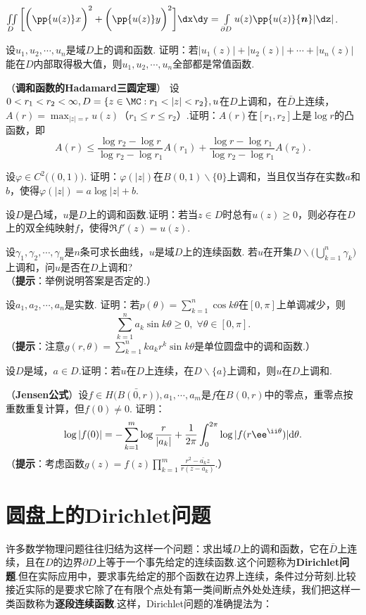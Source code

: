 \begin{xiti}
\begin{enuma}
  \item $\iint\limits_D\bigg[\bigg(\pp{u(z)}x\bigg)^2+\bigg(\pp{u(z)}y\bigg)^2\bigg]
  \dx\dy=\int\limits_{\partial D}u(z)\pp{u(z)}{\boldsymbol n}|\dz|$.
\end{enuma}
\item 设$u_1,u_2,\cdots,u_n$是域$D$上的调和函数. 证明：若$|u_1(z)|+|u_2(z)|+\cdots+|u_n(z)|$能在$D$内部取得极大值，则$u_1,u_2,\cdots,u_n$全部都是常值函数.
\item （\textbf{调和函数的Hadamard三圆定理}）
设$0<r_1<r_2<\infty,D=\{z\in\MC:r_1<|z|<r_2\},u$在$D$上调和，在$\bar D$上连续，$A(r)=\max_{|z|=r}u(z)$（$r_1\le r\le r_2$）.证明：$A(r)$在$[r_1,r_2]$上是$\log r$的凸函数，即
\[A(r)\le\frac{\log r_2-\log r}{\log r_2-\log r_1}A(r_1)+\frac{\log r-\log r_1}
{\log r_2-\log r_1}A(r_2).\]
\item 设$\varphi\in C^2\big((0,1)\big)$. 证明：$\varphi(|z|)$在$B(0,1)\backslash\{0\}$上调和，当且仅当存在实数$a$和$b$，使得$\varphi(|z|)=a\log|z|+b$.
\item 设$D$是凸域，$u$是$D$上的调和函数.证明：若当$z\in D$时总有$u(z)\ge0$，则必存在$D$上的双全纯映射$f$，使得$\Re f'(z)=u(z)$.
\item 设$\gamma_1,\gamma_2,\cdots,\gamma_n$是$n$条可求长曲线，$u$是域$D$上的连续函数. 若$u$在开集$D\backslash\big(\bigcup_{k=1}^n\gamma_k\big)$上调和，问$u$是否在$D$上调和?\\
（\textbf{提示}：举例说明答案是否定的.）
\item 设$a_1,a_2,\cdots,a_n$是实数. 证明：若$p(\theta)=\sum_{k=1}^n\cos k\theta$在$[0,\pi]$上单调减少，则
    \[\sum_{k=1}^n a_k\sin k\theta\ge0,\;\forall \theta\in[0,\pi].\]
（\textbf{提示}：注意$g(r,\theta)=\sum_{k=1}^nka_kr^k\sin k\theta$是单位圆盘中的调和函数.）
\item 设$D$是域，$a\in D$.证明：若$u$在$D$上连续，在$D\backslash\{a\}$上调和，则$u$在$D$上调和.
\item （\textbf{Jensen公式}）设$f\in H\big(\bar{B(0,r)}\big),a_1,\cdots,a_m$是$f$在$B(0,r)$中的零点，重零点按重数重复计算，但$f(0)\ne0$. 证明：
\[\log|f(0)|=-\sum_{k=1}^m\log\frac r{|a_k|}+\frac1{2\pi}\int_0^{2\pi}
\log|f(r\ee^{\ii\theta})|\textrm d\theta.\]
（\textbf{提示}：考虑函数$g(z)=f(z)\prod_{k=1}^m\frac{r^2-\bar{a_k}z}{r(z-a_k)}$.）
\end{xiti}

\section{圆盘上的Dirichlet问题\label{sec8.2}}
许多数学物理问题往往归结为这样一个问题：求出域$D$上的调和函数，它在$\bar D$上连续，且在$D$的边界$\partial D$上等于一个事先给定的连续函数.这个问题称为\textbf{Dirichlet问题}.但在实际应用中，要求事先给定的那个函数在边界上连续，条件过分苛刻.比较接近实际的是要求它除了在有限个点处有第一类间断点外处处连续，我们把这样一类函数称为\textbf{逐段连续函数}.这样，Dirichlet问题的准确提法为：

